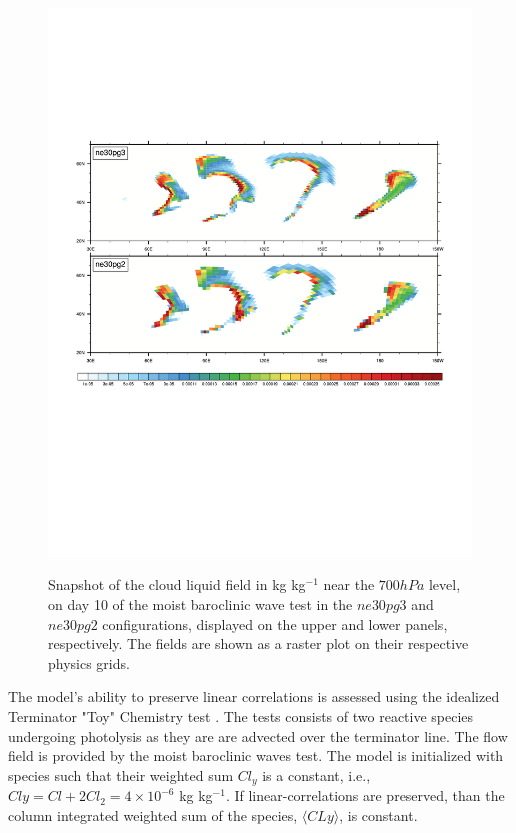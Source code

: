 \documentclass[draft,linenumbers]{agujournal}
\begin{document}
\begin{figure}[t]
\begin{center}
\noindent\includegraphics[width=30pc,angle=0]{temp_CLDLIQ.pdf}\\
\end{center}
\caption{Snapshot of the cloud liquid field in kg kg$^{-1}$ near the $700 hPa$ level, on day 10 of the moist baroclinic wave test in the $ne30pg3$ and $ne30pg2$ configurations, displayed on the upper and lower panels, respectively. The fields are shown as a raster plot on their respective physics grids.}
\label{fig:baro}
\end{figure}

The model's ability to preserve linear correlations is assessed using the idealized Terminator "Toy" Chemistry test \citep{LCLVT2015GMD,LTOUNGK2017MWR}. The tests consists of two reactive species undergoing photolysis as they are are advected over the terminator line. The flow field is provided by the moist baroclinic waves test. The model is initialized with species such that their weighted sum $Cl_y$ is a constant, i.e., $Cly = Cl + 2Cl_2 = 4\times10^{-6}$ kg kg$^{-1}$. If linear-correlations are preserved, than the column integrated weighted sum of the species, $\langle CLy \rangle$, is constant.
\end{document}
